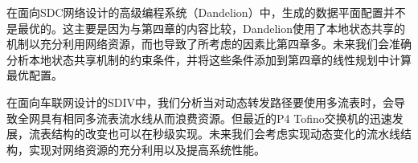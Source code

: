 在面向SDC网络设计的高级编程系统（Dandelion）中，生成的数据平面配置并不是最优的。这主要是因为与第四章的内容比较，Dandelion使用了本地状态共享的机制以充分利用网络资源，而也导致了所考虑的因素比第四章多。未来我们会准确分析本地状态共享机制的约束条件，并将这些条件添加到第四章的线性规划中计算最优配置。

在面向车联网设计的SDIV中，我们分析当对动态转发路径要使用多流表时，会导致全网具有相同多流表流水线从而浪费资源。但最近的P4 Tofino交换机的迅速发展，流表结构的改变也可以在秒级实现。未来我们会考虑实现动态变化的流水线结构，实现对网络资源的充分利用以及提高系统性能。



%

